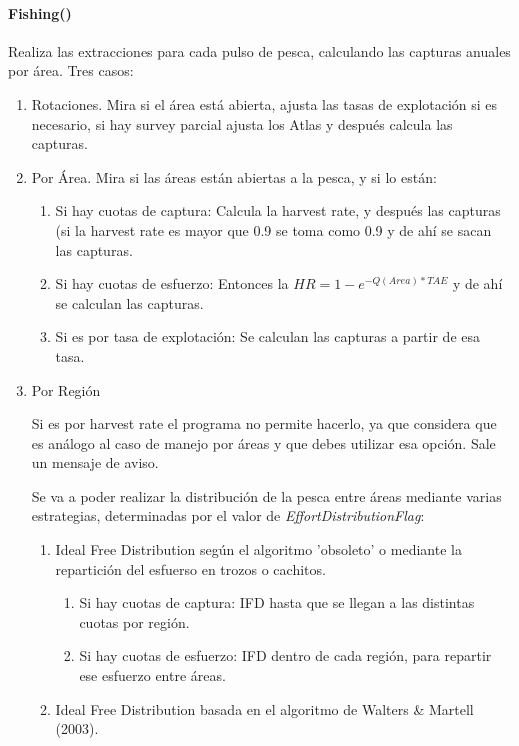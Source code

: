 \documentclass[12pt, oneside, a4paper]{article}
\begin{document}
			\paragraph{Fishing()}
				Realiza las extracciones para cada pulso de pesca, calculando las capturas anuales por área. 
				Tres casos:
				\begin{enumerate}
					\item Rotaciones. Mira si el área está abierta, ajusta las tasas de explotación si es necesario, si hay survey parcial ajusta los Atlas y después calcula las capturas. 
					\item Por Área. Mira si las áreas están abiertas a la pesca, y si lo están:
						\begin{enumerate}
							\item Si hay cuotas de captura: Calcula la harvest rate, y después las capturas (si la harvest rate es mayor que 0.9 se toma como 0.9 y de ahí se sacan las capturas. 
							\item Si hay cuotas de esfuerzo: Entonces la $HR=1-e^{-Q(Area)*TAE}$ y de ahí se calculan las capturas.
							\item Si es por tasa de explotación: Se calculan las capturas a partir de esa tasa. 
						\end{enumerate}
					\item Por Región
					 \par Si es por harvest rate el programa no permite hacerlo, ya que considera que es análogo al caso de manejo por áreas y que debes utilizar esa opción. Sale un mensaje de aviso.
					\par Se va a poder realizar la distribución de la pesca entre áreas mediante varias estrategias, determinadas por el valor de \emph{EffortDistributionFlag}:
					\begin{enumerate}
						\item Ideal Free Distribution según el algoritmo 'obsoleto' o mediante la repartición del esfuerso en trozos o cachitos. 
						\begin{enumerate}
							\item Si hay cuotas de captura: IFD hasta que se llegan a las distintas cuotas por región.
							\item Si hay cuotas de esfuerzo: IFD dentro de cada región, para repartir ese esfuerzo entre áreas. 	 
						\end{enumerate}
						\item Ideal Free Distribution basada en el algoritmo de Walters \& Martell (2003). 
						\begin{enumerate}

\end{enumerate}
\end{enumerate}
\end{enumerate}
\end{document}
